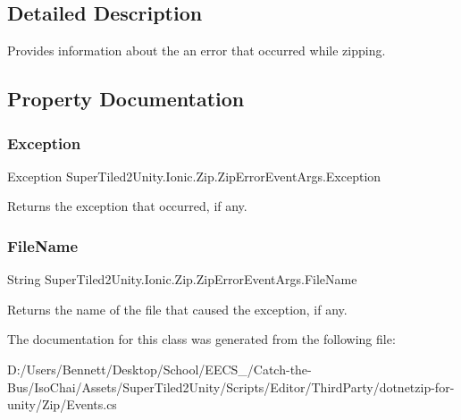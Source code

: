 \subsection{Detailed Description}
Provides information about the an error that occurred while zipping. 



\subsection{Property Documentation}
\mbox{\label{class_super_tiled2_unity_1_1_ionic_1_1_zip_1_1_zip_error_event_args_aa32098f8b5a00fab4c429264745be139}} 
\subsubsection{\texorpdfstring{Exception}{Exception}}
{\footnotesize\ttfamily Exception Super\+Tiled2\+Unity.\+Ionic.\+Zip.\+Zip\+Error\+Event\+Args.\+Exception\hspace{0.3cm}{\ttfamily [get]}}



Returns the exception that occurred, if any. 

\mbox{\label{class_super_tiled2_unity_1_1_ionic_1_1_zip_1_1_zip_error_event_args_a876d391994b97d490d8cb2a641f650d5}} 
\subsubsection{\texorpdfstring{File\+Name}{FileName}}
{\footnotesize\ttfamily String Super\+Tiled2\+Unity.\+Ionic.\+Zip.\+Zip\+Error\+Event\+Args.\+File\+Name\hspace{0.3cm}{\ttfamily [get]}}



Returns the name of the file that caused the exception, if any. 



The documentation for this class was generated from the following file\+:\begin{DoxyCompactItemize}
\item 
D\+:/\+Users/\+Bennett/\+Desktop/\+School/\+E\+E\+C\+S\+\_/\+Catch-\/the-\/\+Bus/\+Iso\+Chai/\+Assets/\+Super\+Tiled2\+Unity/\+Scripts/\+Editor/\+Third\+Party/dotnetzip-\/for-\/unity/\+Zip/Events.\+cs\end{DoxyCompactItemize}
